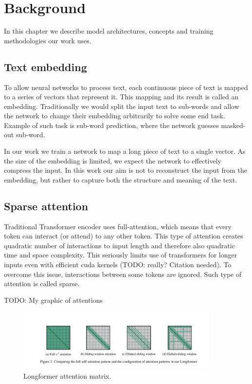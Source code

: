 \chapter{Background}

In this chapter we describe model architectures, concepts and training
methodologies our work uses.


\section{Text embedding}

To allow neural networks to process text, each continuous piece of text is
mapped to a series of vectors that represent it. This mapping and its result is
called an embedding. Traditionally we would split the input text
to sub-words and allow the network to change their embedding arbitrarily to
solve some end task. Example of such task is sub-word prediction, where the
network guesses masked-out sub-word.

In our work we train a network to map a long piece of text to a single vector.
As the size of the embedding is limited, we expect the network to effectively
compress the input. In this work our aim is not to reconstruct the input from
the embedding, but rather to capture both the structure and meaning of the text.

\section{Sparse attention}

Traditional Transformer encoder uses full-attention, which means that every
token can interact (or attend) to any other token. This type of attention
creates quadratic number of interactions to input length and therefore also
quadratic time and space complexity. This seriously limits use of transformers
for longer inputs even with efficient cuda kernels (TODO: really? Citation
needed). To overcome this issue, interactions between some tokens are ignored.
Such type of attention is called sparse.

TODO: My graphic of attentions

\begin{figure}[h]
    \centering
    \includegraphics[width=0.9\textwidth]{./img/longformer_attention.png}
    \caption{Longformer attention matrix.\label{fig:longformer_sparse_att}}
\end{figure}

